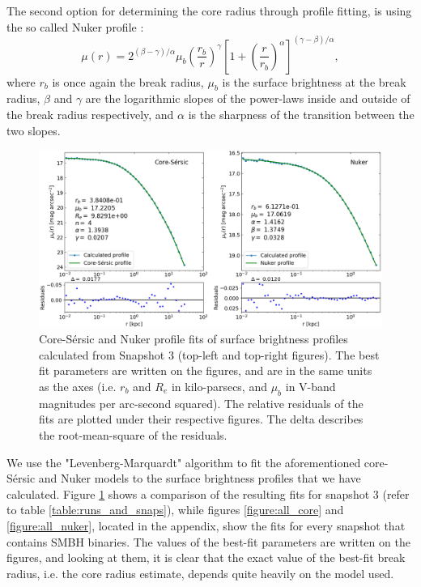 \documentclass[english, oneside]{HYgradu}
\begin{document}
The second option for determining the core radius through profile fitting, is using the so called Nuker profile \citep{Lauer1995}:
\begin{equation}
\mu(r) = 2^{(\beta - \gamma) / \alpha} \mu_b \left( \frac{r_b}{r} \right)^\gamma \left[ 1 + \left( \frac{r}{r_b} \right)^\alpha \right]^{(\gamma - \beta)/\alpha},
\label{eq:nuker}
\end{equation}
where $r_b$ is once again the break radius, $\mu_b$ is the surface brightness at the break radius, $\beta$ and $\gamma$ are the logarithmic slopes of the power-laws inside and outside of the break radius respectively, and $\alpha$ is the sharpness of the transition between the two slopes.

\begin{figure}[h]
	\centering
	\includegraphics[width=\textwidth]{core_nuker_fits.png}
	\caption{Core-Sérsic and Nuker profile fits of surface brightness profiles calculated from Snapshot 3 (top-left and top-right figures). The best fit parameters are written on the figures, and are in the same units as the axes (i.e. $r_b$ and $R_e$ in kilo-parsecs, and $\mu_b$ in V-band magnitudes per arc-second squared). The relative residuals of the fits are plotted under their respective figures. The delta describes the root-mean-square of the residuals.}
	\label{figure:core_nuker}
\end{figure}

We use the "Levenberg-Marquardt" algorithm to fit the aforementioned core-Sérsic and Nuker models to the surface brightness profiles that we have calculated. Figure \ref{figure:core_nuker} shows a comparison of the resulting fits for snapshot 3 (refer to table \ref{table:runs_and_snaps}), while figures \ref{figure:all_core} and \ref{figure:all_nuker}, located in the appendix, show the fits for every snapshot that contains SMBH binaries. The values of the best-fit parameters are written on the figures, and looking at them, it is clear that the exact value of the best-fit break radius, i.e. the core radius estimate, depends quite heavily on the model used.
\end{document}
